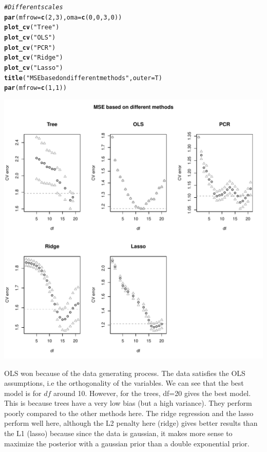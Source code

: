 \documentclass[11pt]{article}\usepackage[]{graphicx}\usepackage[]{color}
\makeatletter
\def\maxwidth{ %
  \ifdim\Gin@nat@width>\linewidth
    \linewidth
  \else
    \Gin@nat@width
  \fi
}
\newcommand{\hlnum}[1]{\textcolor[rgb]{0.686,0.059,0.569}{#1}}%
\newcommand{\hlstr}[1]{\textcolor[rgb]{0.192,0.494,0.8}{#1}}%
\newcommand{\hlcom}[1]{\textcolor[rgb]{0.678,0.584,0.686}{\textit{#1}}}%
\newcommand{\hlstd}[1]{\textcolor[rgb]{0.345,0.345,0.345}{#1}}%
\newcommand{\hlkwc}[1]{\textcolor[rgb]{0.333,0.667,0.333}{#1}}%
\newcommand{\hlkwd}[1]{\textcolor[rgb]{0.737,0.353,0.396}{\textbf{#1}}}%
\newenvironment{kframe}{%
 \def\at@end@of@kframe{}%
 \ifinner\ifhmode%
  \def\at@end@of@kframe{\end{minipage}}%
  \begin{minipage}{\columnwidth}%
 \fi\fi%
 \def\FrameCommand##1{\hskip\@totalleftmargin \hskip-\fboxsep
 \colorbox{shadecolor}{##1}\hskip-\fboxsep
     \hskip-\linewidth \hskip-\@totalleftmargin \hskip\columnwidth}%
 \MakeFramed {\advance\hsize-\width
   \@totalleftmargin\z@ \linewidth\hsize
   \@setminipage}}%
 {\par\unskip\endMakeFramed%
 \at@end@of@kframe}
\newenvironment{knitrout}{}{} %
\makeatother
\begin{document}
\begin{knitrout}
\color{fgcolor}\begin{kframe}
\begin{alltt}
\hlcom{# Different scales}
\hlkwd{par}\hlstd{(}\hlkwc{mfrow}\hlstd{=}\hlkwd{c}\hlstd{(}\hlnum{2}\hlstd{,}\hlnum{3}\hlstd{),}\hlkwc{oma}\hlstd{=}\hlkwd{c}\hlstd{(}\hlnum{0}\hlstd{,}\hlnum{0}\hlstd{,}\hlnum{3}\hlstd{,}\hlnum{0}\hlstd{))}
\hlkwd{plot_cv}\hlstd{(}\hlstr{"Tree"}\hlstd{)}
\hlkwd{plot_cv}\hlstd{(}\hlstr{"OLS"}\hlstd{)}
\hlkwd{plot_cv}\hlstd{(}\hlstr{"PCR"}\hlstd{)}
\hlkwd{plot_cv}\hlstd{(}\hlstr{"Ridge"}\hlstd{)}
\hlkwd{plot_cv}\hlstd{(}\hlstr{"Lasso"}\hlstd{)}
\hlkwd{title}\hlstd{(}\hlstr{"MSE based on different methods"}\hlstd{,}\hlkwc{outer}\hlstd{=T)}
\hlkwd{par}\hlstd{(}\hlkwc{mfrow}\hlstd{=}\hlkwd{c}\hlstd{(}\hlnum{1}\hlstd{,}\hlnum{1}\hlstd{))}
\end{alltt}
\end{kframe}
\includegraphics[width=\maxwidth]{figure/unnamed-chunk-4-1} 

\end{knitrout}

OLS won because of the data generating process. The data satisfies the OLS assumptions, i.e the orthogonality of the variables. We can see that the best model is for $df$ around 10. However, for the trees, df=20 gives the best model. This is because trees have a very low bias (but a high variance). They perform poorly compared to the other methods here. The ridge regression and the lasso perform well here, although the L2 penalty here (ridge) gives better results than the L1 (lasso) because since the data is gaussian, it makes more sense to maximize the posterior with a gaussian prior than a double exponential prior.
\end{document}
